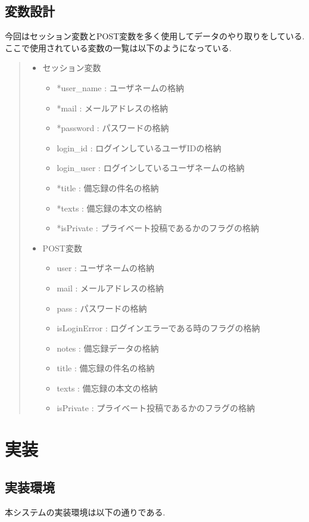 \documentclass[submit,techrep]{ipsj}
\begin{document}
\subsection{変数設計}

今回はセッション変数とPOST変数を多く使用してデータのやり取りをしている. ここで使用されている変数の一覧は以下のようになっている. 

\begin{quote}
 \begin{itemize}
  \item セッション変数
   \begin{itemize}
    \item *user\_name : ユーザネームの格納
    \item *mail : メールアドレスの格納
    \item *password : パスワードの格納
    \item login\_id : ログインしているユーザIDの格納
    \item login\_user : ログインしているユーザネームの格納
    \item *title : 備忘録の件名の格納
    \item *texts : 備忘録の本文の格納
    \item *isPrivate : プライベート投稿であるかのフラグの格納
   \end{itemize}
  \item POST変数
   \begin{itemize}
    \item user : ユーザネームの格納
    \item mail : メールアドレスの格納
    \item pass : パスワードの格納
    \item isLoginError : ログインエラーである時のフラグの格納
    \item notes : 備忘録データの格納
    \item title : 備忘録の件名の格納
    \item texts : 備忘録の本文の格納
    \item isPrivate : プライベート投稿であるかのフラグの格納
   \end{itemize}
 \end{itemize}
\end{quote}

\section{実装}
\subsection{実装環境}
本システムの実装環境は以下の通りである. 
\end{document}
